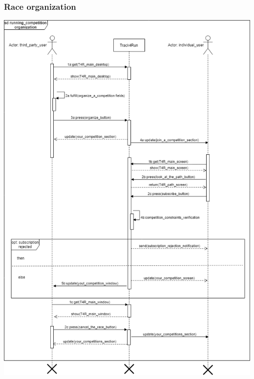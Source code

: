 \subsubsection{Race organization}
\includegraphics[scale = 0.5]{sections/requirements/sequenceDiagrams/T4R_race_organization.png}
\clearpage

